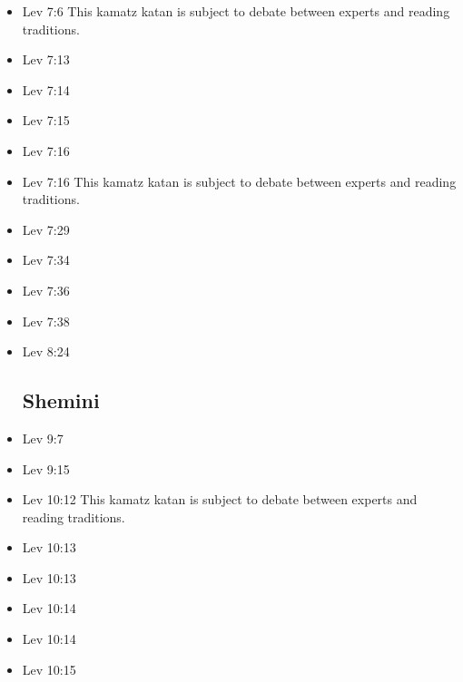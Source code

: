 \documentclass[14pt]{book}
\begin{document}
\begin{multicols}{2}
\begin{itemize}
\item Lev 7:6 This kamatz katan is subject to debate between experts and reading traditions.

\item Lev 7:13

\item Lev 7:14

\item Lev 7:15

\item Lev 7:16

\item Lev 7:16 This kamatz katan is subject to debate between experts and reading traditions.

\item Lev 7:29

\item Lev 7:34

\item Lev 7:36

\item Lev 7:38

\item Lev 8:24

\subsection{Shemini}

\item Lev 9:7

\item Lev 9:15

\item Lev 10:12 This kamatz katan is subject to debate between experts and reading traditions.

\item Lev 10:13

\item Lev 10:13

\item Lev 10:14

\item Lev 10:14

\item Lev 10:15


\end{itemize}
\end{multicols}
\end{document}
